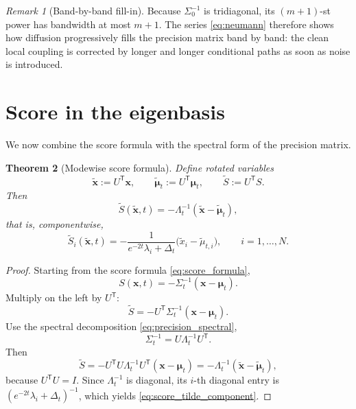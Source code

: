 \documentclass[11pt]{article}
\numberwithin{equation}{section}
\newtheorem{theorem}{Theorem}[section]
\theoremstyle{definition}
\theoremstyle{remark}
\newtheorem{remark}[theorem]{Remark}
\newcommand{\Id}{I}
\newcommand{\trans}{\mathsf{T}}
\begin{document}
\begin{remark}[Band-by-band fill-in]
Because $\Sigma_0^{-1}$ is tridiagonal, its $(m+1)$-st power has bandwidth at most $m+1$. The series \eqref{eq:neumann} therefore shows how diffusion progressively fills the precision matrix band by band: the clean local coupling is corrected by longer and longer conditional paths as soon as noise is introduced.
\end{remark}

\section{Score in the eigenbasis}\label{sec:score_eigenbasis}

We now combine the score formula with the spectral form of the precision matrix.

\begin{theorem}[Modewise score formula]\label{thm:score_eigenbasis}
Define rotated variables
\[
\widetilde{\mathbf x}:=U^\trans\mathbf x,
\qquad
\widetilde{\boldsymbol{\mu}}_t:=U^\trans\boldsymbol{\mu}_t,
\qquad
\widetilde S:=U^\trans S.
\]
Then
\begin{equation}\label{eq:score_tilde_vector}
\widetilde S(\widetilde{\mathbf x},t)
=
-\Lambda_t^{-1}(\widetilde{\mathbf x}-\widetilde{\boldsymbol{\mu}}_t),
\end{equation}
that is, componentwise,
\begin{equation}\label{eq:score_tilde_component}
\widetilde S_i(\widetilde{\mathbf x},t)
=
-\frac{1}{e^{-2t}\lambda_i+\Delta_t}
\big(\widetilde x_i-\widetilde\mu_{t,i}\big),
\qquad i=1,\dots,N.
\end{equation}
\end{theorem}

\begin{proof}
Starting from the score formula \eqref{eq:score_formula},
\[
S(\mathbf x,t)=-\Sigma_t^{-1}(\mathbf x-\boldsymbol{\mu}_t).
\]
Multiply on the left by $U^\trans$:
\[
\widetilde S
=
-U^\trans\Sigma_t^{-1}(\mathbf x-\boldsymbol{\mu}_t).
\]
Use the spectral decomposition \eqref{eq:precision_spectral},
\[
\Sigma_t^{-1}=U\Lambda_t^{-1}U^\trans.
\]
Then
\[
\widetilde S
=
-U^\trans U\Lambda_t^{-1}U^\trans(\mathbf x-\boldsymbol{\mu}_t)
=
-\Lambda_t^{-1}(\widetilde{\mathbf x}-\widetilde{\boldsymbol{\mu}}_t),
\]
because $U^\trans U=\Id$. Since $\Lambda_t^{-1}$ is diagonal, its $i$-th diagonal entry is $(e^{-2t}\lambda_i+\Delta_t)^{-1}$, which yields \eqref{eq:score_tilde_component}.
\end{proof}
\end{document}
